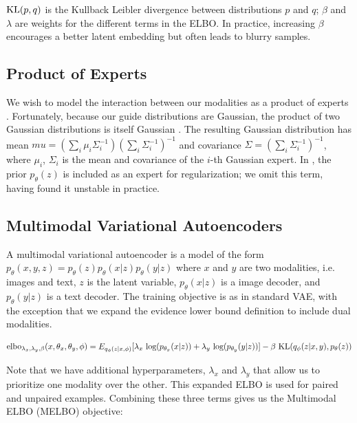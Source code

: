 \documentclass{article}
\begin{document}
$\textup{KL}(p, q)$ is the Kullback Leibler divergence between distributions $p$ and $q$; $\beta$ and $\lambda$ are weights for the different terms in the ELBO. In practice, increasing $\beta$ encourages a better latent embedding but often leads to blurry samples.

\subsection{Product of Experts}

We wish to model the interaction between our modalities as a product of experts \cite{hinton2006training}. Fortunately, because our guide distributions are Gaussian, the product of two Gaussian distributions is itself Gaussian \cite{cao2014generalized}. The resulting Gaussian distribution has mean $mu = (\sum_{i} \mu_{i}\Sigma^{-1}_{i})(\sum_{i}\Sigma^{-1}_{i})^{-1}$ and covariance $\Sigma = (\sum_{i} \Sigma^{-1}_{i})^{-1}$, where $\mu_{i}$, $\Sigma_{i}$ is the mean and covariance of the $i$-th Gaussian expert. In \cite{hinton2006training}, the prior $p_{\theta}(z)$ is included as an expert for regularization; we omit this term, having found it unstable in practice.

\subsection{Multimodal Variational Autoencoders}

A multimodal variational autoencoder is a model of the form $p_{\theta}(x, y, z) = p_{\theta}(z)p_{\theta}(x|z)p_{\theta}(y|z)$ where $x$ and $y$ are two modalities, i.e. images and text, $z$ is the latent variable, $p_{\theta}(x|z)$ is a image decoder, and $p_{\theta}(y|z)$ is a text decoder. The training objective is as in standard VAE, with the exception that we expand the evidence lower bound definition to include dual modalities.

\begin{equation}
    \textup{elbo}_{\lambda_{x}, \lambda_{y}, \beta}(x, \theta_{x}, \theta_{y}, \phi) = E_{q_{\phi}(z|x, \phi)}[\lambda_{x} \textup{ log}(p_{\theta_{x}}(x|z)) + \lambda_{y} \textup{ log}(p_{\theta_{y}}(y|z))] - \beta \textup{ KL}(q_{\phi}(z|x, y), p_{\theta}(z))
\end{equation}

Note that we have additional hyperparameters, $\lambda_{x}$ and $\lambda_{y}$ that allow us to prioritize one modality over the other. This expanded ELBO is used for paired and unpaired examples. Combining these three terms gives us the Multimodal ELBO (MELBO) objective:
\end{document}
